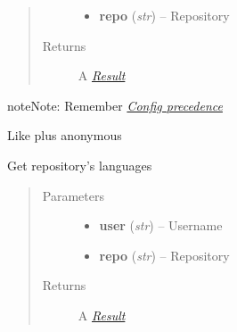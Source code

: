 \documentclass[letterpaper,10pt,english]{sphinxmanual}
\begin{document}
\begin{fulllineitems}
\begin{fulllineitems}
\begin{quote}
\begin{description}
\begin{itemize}
\item {} 
\textbf{repo} (\emph{str}) -- Repository

\end{itemize}

\item[{Returns}] \leavevmode
A {\hyperref[result::doc]{\emph{Result}}}

\end{description}\end{quote}

\begin{notice}{note}{Note:}
Remember {\hyperref[repos:config-precedence]{\emph{Config precedence}}}
\end{notice}

\end{fulllineitems}


\begin{fulllineitems}
\label{repos:pygithub3.services.repos.Repo.list_contributors_with_anonymous}
Like {\hyperref[repos:pygithub3.services.repos.Repo.list_contributors]{}} plus
anonymous

\end{fulllineitems}


\begin{fulllineitems}
\label{repos:pygithub3.services.repos.Repo.list_languages}
Get repository's languages
\begin{quote}\begin{description}
\item[{Parameters}] \leavevmode\begin{itemize}
\item {} 
\textbf{user} (\emph{str}) -- Username

\item {} 
\textbf{repo} (\emph{str}) -- Repository

\end{itemize}

\item[{Returns}] \leavevmode
A {\hyperref[result::doc]{\emph{Result}}}


\end{description}
\end{quote}
\end{fulllineitems}
\end{fulllineitems}
\end{document}
